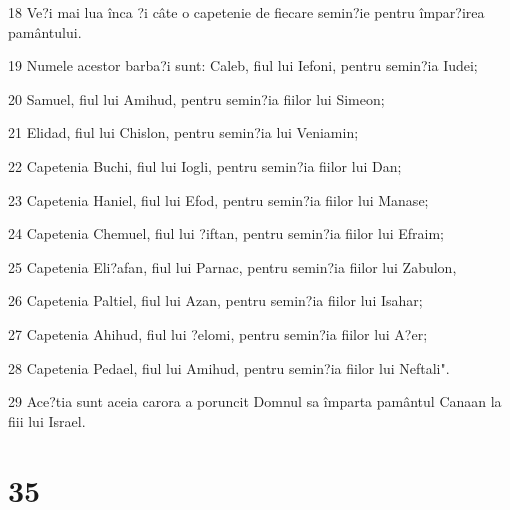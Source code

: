 \par 18 Ve?i mai lua înca ?i câte o capetenie de fiecare semin?ie pentru împar?irea pamântului.
\par 19 Numele acestor barba?i sunt: Caleb, fiul lui Iefoni, pentru semin?ia Iudei;
\par 20 Samuel, fiul lui Amihud, pentru semin?ia fiilor lui Simeon;
\par 21 Elidad, fiul lui Chislon, pentru semin?ia lui Veniamin;
\par 22 Capetenia Buchi, fiul lui Iogli, pentru semin?ia fiilor lui Dan;
\par 23 Capetenia Haniel, fiul lui Efod, pentru semin?ia fiilor lui Manase;
\par 24 Capetenia Chemuel, fiul lui ?iftan, pentru semin?ia fiilor lui Efraim;
\par 25 Capetenia Eli?afan, fiul lui Parnac, pentru semin?ia fiilor lui Zabulon,
\par 26 Capetenia Paltiel, fiul lui Azan, pentru semin?ia fiilor lui Isahar;
\par 27 Capetenia Ahihud, fiul lui ?elomi, pentru semin?ia fiilor lui A?er;
\par 28 Capetenia Pedael, fiul lui Amihud, pentru semin?ia fiilor lui Neftali".
\par 29 Ace?tia sunt aceia carora a poruncit Domnul sa împarta pamântul Canaan la fiii lui Israel.

\chapter{35}

